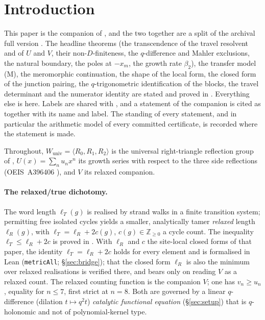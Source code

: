 \documentclass[11pt]{article}
\theoremstyle{plain}
\theoremstyle{definition}
\theoremstyle{remark}
\newcommand{\Z}{\mathbb{Z}}
\begin{document}
\section{Introduction}\label{sec:intro}

This paper is the companion of \cite{Bonfioli2026bA}, and the two together are a split of the
archival full version \cite{Bonfioli2026b}. The headline theorems (the transcendence of the travel
resolvent and of $U$ and $V$, their non-$D$-finiteness, the $q$-difference and Mahler exclusions,
the natural boundary, the poles at $-x_m$, the growth rate $\beta_2$), the transfer model
\textup{(M)}, the meromorphic continuation, the shape of the local form, the closed form of the
junction pairing, the $q$-trigonometric identification of the blocks, the travel determinant and
the numerator identity are stated and proved in \cite{Bonfioli2026bA}. Everything else is here.
Labels are shared with \cite{Bonfioli2026b}, and a statement of the companion is cited as
\cite{Bonfioli2026bA} together with its name and label. The standing of every statement, and in
particular the arithmetic model of every committed certificate, is recorded where the statement is
made.

Throughout, $W_{\mathrm{univ}}=\langle R_0,R_1,R_2\rangle$ is the universal right-triangle
reflection group of \cite{Bonfioli2026a}, $U(x)=\sum_nu_nx^n$ its growth series with respect to
the three side reflections (\textup{OEIS~A396406} \cite{OEIS}), and $V$ its relaxed companion.

\paragraph{The relaxed/true dichotomy.} The word length $\ell_T(g)$ is realised by strand walks in
a finite transition system; permitting free isolated cycles yields a smaller, analytically tamer
\emph{relaxed} length $\ell_R(g)$, with $\ell_T=\ell_R+2c(g)$, $c(g)\in\Z_{\ge0}$ a cycle count.
The inequality $\ell_T\le\ell_R+2c$ is proved in \cite{Bonfioli2026a}. With $\ell_R$ and $c$ the
site-local closed forms of that paper, the identity $\ell_T=\ell_R+2c$ holds for every element and
is formalised in Lean (\texttt{metricAll}; \S\ref{sec:bridge}); that the closed form $\ell_R$ is
also the minimum over relaxed realisations is verified there, and bears only on reading $V$ as a
relaxed count.
The relaxed counting function is the companion $V$; one has $v_n\ge u_n$, equality for $n\le7$,
first strict at $n=8$. Both are governed by a linear $q$-difference (dilation $t\mapsto q^2t$)
\emph{catalytic functional equation} (\S\ref{sec:setup}) that is $q$-holonomic and not of
polynomial-kernel type.
\end{document}
